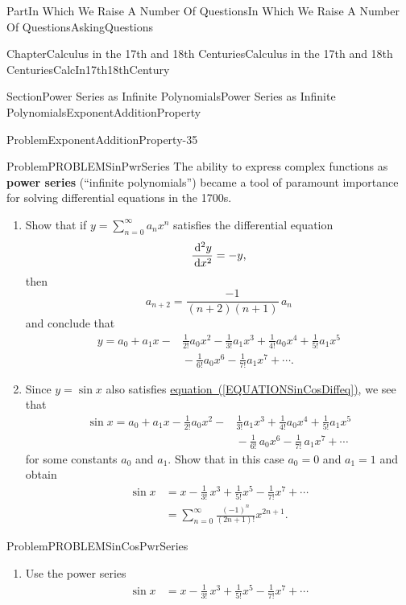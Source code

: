 \documentclass[oneside,10pt,]{book}
\newcommand{\xreffont}{\relax}
\newcommand{\terminology}[1]{\textbf{#1}}
\numberwithin{equation}{part}
\newcommand{\dx}[1]{\,{\rm d}#1}
\newcommand{\amp}{&}
\begin{document}
\begin{partptx}{Part}{In Which We Raise A Number Of Questions}{}{In Which We Raise A Number Of Questions}{}{}{AskingQuestions}
\begin{chapterptx}{Chapter}{Calculus in the 17th and 18th Centuries}{}{Calculus in the 17th and 18th Centuries}{}{}{CalcIn17th18thCentury}
\begin{sectionptx}{Section}{Power Series as Infinite Polynomials}{}{Power Series as Infinite Polynomials}{}{}{ExponentAdditionProperty}
\begin{problem}{Problem}{}{ExponentAdditionProperty-35}
\end{problem}
\begin{problem}{Problem}{}{PROBLEMSinPwrSeries}%
The ability to express complex functions as \terminology{power series} (``infinite polynomials'') became a tool of paramount importance for solving differential equations in the 1700s.%
\begin{enumerate}[font=\bfseries,label=(\alph*),ref=\alph*]%
\item{}Show that if \(y=\sum_{n=0}^\infty a_nx^n\) satisfies the differential equation%
\begin{equation}
\frac{\dx^2y}{\dx{ x}^2}=-y\text{,}\label{EQUATIONSinCosDiffeq}
\end{equation}
then%
\begin{equation*}
a_{n+2}=\frac{-1}{\left(n+2\right)\left(n+1\right)}\,a_n
\end{equation*}
and conclude that%
\begin{align*}
y=a_0+a_1x-\amp{}\frac{1}{2!}a_0x^2-\frac{1}{3!}a_1x^3+\frac{1}{4!}a_0x^4+\frac{1}{5!}a_1x^5\\
\amp{}-\frac{1}{6!}a_0x^6-\frac{1}{7!}a_1x^7+\cdots.
\end{align*}
%
\item{}Since \(y=\sin x\) also satisfies \hyperref[EQUATIONSinCosDiffeq]{equation~({\xreffont\ref{EQUATIONSinCosDiffeq}})}, we see that%
\begin{align*}
\sin x=a_0+a_1x-\frac{1}{2!}a_0x^2-\amp{}\frac{1}{3!}a_1x^3+\frac{1}{4!}a_0x^4+\frac{1}{5!}a_1x^5\\
\amp{}-\frac{1}{6!}\,a_0x^6-\frac{1}{7!}\,a_1x^7+\cdots
\end{align*}
for some constants \(a_0\) and \(a_1\).  Show that in this case \(a_0=0\) and \(a_1=1\) and obtain%
\begin{align*}
\sin
x\amp{}=x-\frac{1}{3!}\,x^3+\frac{1}{5!}x^5-\frac{1}{7!}x^7+\cdots\\
\amp{}=\sum_{n=0}^\infty\frac{\left(-1\right)^n}{\left(2n+1\right)!}x^{2n+1}.
\end{align*}
%
\end{enumerate}%
\end{problem}
\begin{problem}{Problem}{}{PROBLEMSinCosPwrSeries}%
\begin{enumerate}[font=\bfseries,label=(\alph*),ref=\alph*]%
\item{}Use the power series%
\begin{align*}
\sin x\amp{}=x-\frac{1}{3!}\,x^3+\frac{1}{5!}x^5-\frac{1}{7!}x^7+\cdots\\

\end{align*}
\end{enumerate}
\end{problem}
\end{sectionptx}
\end{chapterptx}
\end{partptx}
\end{document}
